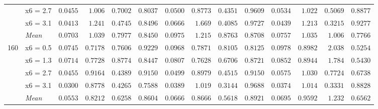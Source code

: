 \begin{table}[htbp]
\begin{tabular}{llrrrrrrrrrrrr}
 & x6 = 2.7 & {\boldmath$0.0455$} & $1.006$ & $0.7002$ & $0.8037$ & $0.0500$ & {\boldmath$0.8773$} & {\boldmath$0.4351$} & {\boldmath$0.9609$} & $0.0534$ & $1.022$ & $0.5069$ & $0.8877$ \\
 & x6 = 3.1 & {\boldmath$0.0413$} & $1.241$ & $0.4745$ & $0.8496$ & $0.0666$ & $1.669$ & $0.4085$ & $0.9727$ & $0.0439$ & {\boldmath$1.213$} & {\boldmath$0.3215$} & {\boldmath$0.9277$} \\
 & \textit{Mean} & \colorbox{green!20}{\boldmath$0.0703$} & $1.039$ & \colorbox{green!20}{\boldmath$0.7977$} & $0.8450$ & $0.0975$ & $1.215$ & $0.8763$ & \colorbox{green!20}{\boldmath$0.8708$} & $0.0757$ & \colorbox{green!20}{\boldmath$1.035$} & $1.006$ & $0.7766$ \\
\midrule
\multirow{5}{*}{160} & x6 = 0.5 & {\boldmath$0.0745$} & {\boldmath$0.7178$} & {\boldmath$0.7606$} & {\boldmath$0.9229$} & $0.0968$ & $0.7871$ & $0.8105$ & $0.8125$ & $0.0978$ & $0.8982$ & $2.038$ & $0.5254$ \\
 & x6 = 1.3 & {\boldmath$0.0714$} & $0.7728$ & $0.8774$ & $0.8447$ & $0.0807$ & {\boldmath$0.7628$} & {\boldmath$0.6706$} & {\boldmath$0.8721$} & $0.0852$ & $0.8944$ & $1.784$ & $0.5430$ \\
 & x6 = 2.7 & {\boldmath$0.0455$} & $0.9164$ & {\boldmath$0.4389$} & {\boldmath$0.9150$} & $0.0499$ & {\boldmath$0.8979$} & $0.4515$ & $0.9150$ & $0.0575$ & $1.030$ & $0.7724$ & $0.6738$ \\
 & x6 = 3.1 & {\boldmath$0.0300$} & {\boldmath$0.8778$} & $0.4265$ & $0.7588$ & $0.0389$ & $1.019$ & {\boldmath$0.3144$} & {\boldmath$0.9688$} & $0.0374$ & $1.014$ & $0.3331$ & $0.8828$ \\
 & \textit{Mean} & \colorbox{green!20}{\boldmath$0.0553$} & \colorbox{green!20}{\boldmath$0.8212$} & $0.6258$ & $0.8604$ & $0.0666$ & $0.8666$ & \colorbox{green!20}{\boldmath$0.5618$} & \colorbox{green!20}{\boldmath$0.8921$} & $0.0695$ & $0.9592$ & $1.232$ & $0.6562$ \\
\bottomrule
\end{tabular}
\end{table}
